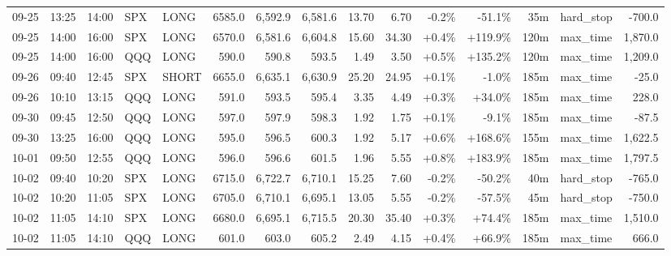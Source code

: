 \documentclass[11pt,a4paper,twoside]{article}
\begin{document}
\begin{landscape}
\begin{center}
\begin{longtable}{>{\color{txtmain}}l l l l l r r r r r r r r >{\color{txtmain}}l r}
09-25 & 13:25 & 14:00 & SPX & LONG & 6585.0 & 6,592.9 & 6,581.6 & 13.70 & 6.70 & \textcolor{lossred}{-0.2\%} & \textcolor{lossred}{-51.1\%} & 35m & hard\_stop & \textcolor{lossred}{-700.0} \\
09-25 & 14:00 & 16:00 & SPX & LONG & 6570.0 & 6,581.6 & 6,604.8 & 15.60 & 34.30 & \textcolor{wingreen}{+0.4\%} & \textcolor{wingreen}{+119.9\%} & 120m & max\_time & \textcolor{wingreen}{1,870.0} \\
09-25 & 14:00 & 16:00 & QQQ & LONG & 590.0 & 590.8 & 593.5 & 1.49 & 3.50 & \textcolor{wingreen}{+0.5\%} & \textcolor{wingreen}{+135.2\%} & 120m & max\_time & \textcolor{wingreen}{1,209.0} \\
09-26 & 09:40 & 12:45 & SPX & SHORT & 6655.0 & 6,635.1 & 6,630.9 & 25.20 & 24.95 & \textcolor{wingreen}{+0.1\%} & \textcolor{lossred}{-1.0\%} & 185m & max\_time & \textcolor{lossred}{-25.0} \\
09-26 & 10:10 & 13:15 & QQQ & LONG & 591.0 & 593.5 & 595.4 & 3.35 & 4.49 & \textcolor{wingreen}{+0.3\%} & \textcolor{wingreen}{+34.0\%} & 185m & max\_time & \textcolor{wingreen}{228.0} \\
09-30 & 09:45 & 12:50 & QQQ & LONG & 597.0 & 597.9 & 598.3 & 1.92 & 1.75 & \textcolor{wingreen}{+0.1\%} & \textcolor{lossred}{-9.1\%} & 185m & max\_time & \textcolor{lossred}{-87.5} \\
09-30 & 13:25 & 16:00 & QQQ & LONG & 595.0 & 596.5 & 600.3 & 1.92 & 5.17 & \textcolor{wingreen}{+0.6\%} & \textcolor{wingreen}{+168.6\%} & 155m & max\_time & \textcolor{wingreen}{1,622.5} \\
10-01 & 09:50 & 12:55 & QQQ & LONG & 596.0 & 596.6 & 601.5 & 1.96 & 5.55 & \textcolor{wingreen}{+0.8\%} & \textcolor{wingreen}{+183.9\%} & 185m & max\_time & \textcolor{wingreen}{1,797.5} \\
10-02 & 09:40 & 10:20 & SPX & LONG & 6715.0 & 6,722.7 & 6,710.1 & 15.25 & 7.60 & \textcolor{lossred}{-0.2\%} & \textcolor{lossred}{-50.2\%} & 40m & hard\_stop & \textcolor{lossred}{-765.0} \\
10-02 & 10:20 & 11:05 & SPX & LONG & 6705.0 & 6,710.1 & 6,695.1 & 13.05 & 5.55 & \textcolor{lossred}{-0.2\%} & \textcolor{lossred}{-57.5\%} & 45m & hard\_stop & \textcolor{lossred}{-750.0} \\
10-02 & 11:05 & 14:10 & SPX & LONG & 6680.0 & 6,695.1 & 6,715.5 & 20.30 & 35.40 & \textcolor{wingreen}{+0.3\%} & \textcolor{wingreen}{+74.4\%} & 185m & max\_time & \textcolor{wingreen}{1,510.0} \\
10-02 & 11:05 & 14:10 & QQQ & LONG & 601.0 & 603.0 & 605.2 & 2.49 & 4.15 & \textcolor{wingreen}{+0.4\%} & \textcolor{wingreen}{+66.9\%} & 185m & max\_time & \textcolor{wingreen}{666.0} \\

\end{longtable}
\end{center}
\end{landscape}
\end{document}
